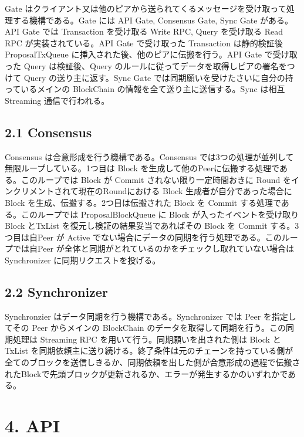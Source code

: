 Gate
はクライアント又は他のピアから送られてくるメッセージを受け取って処理する機構である。Gate
には API Gate, Consensus Gate, Sync Gate がある。API Gate では
Transaction を受け取る Write RPC, Query を受け取る Read RPC
が実装されている。API Gate で受け取った Transaction は静的検証後
ProposalTxQueue に挿入された後、他のピアに伝搬を行う。API Gate
で受け取った Query は検証後、Query
のルールに従ってデータを取得しピアの署名をつけて Query
の送り主に返す。Sync Gate
では同期願いを受けたさいに自分の持っているメインの BlockChain
の情報を全て送り主に送信する。Sync は相互 Streaming 通信で行われる。

\hypertarget{consensus}{%
\subsection{2.1 Consensus}\label{consensus}}

Consensus は合意形成を行う機構である。Consensus
では3つの処理が並列して無限ループしている。1つ目は Block
を生成して他のPeerに伝搬する処理である。このループでは Block が Commit
されない限り一定時間おきに Round
をインクリメントされて現在のRoundにおける Block
生成者が自分であった場合に Block を生成、伝搬する。2つ目は伝搬された
Block を Commit する処理である。このループでは ProposalBlockQueue に
Block が入ったイベントを受け取り Block とTxList
を復元し検証の結果妥当であればその Block を Commit する。3つ目は自Peer
が Active でない場合にデータの同期を行う処理である。このループでは自Peer
が全体と同期がとれているのかをチェックし取れていない場合は Synchronizer
に同期リクエストを投げる。

\hypertarget{synchronizer}{%
\subsection{2.2 Synchronizer}\label{synchronizer}}

Synchronzier はデータ同期を行う機構である。Synchronizer では Peer
を指定してその Peer からメインの BlockChain
のデータを取得して同期を行う。この同期処理は Streaming RPC
を用いて行う。同期願いを出された側は Block と TxList
を同期依頼主に送り続ける。終了条件は元のチェーンを持っている側が全てのブロックを送信しきるか、同期依頼を出した側が合意形成の過程で伝搬されたBlockで先頭ブロックが更新されるか、エラーが発生するかのいずれかである。

\hypertarget{api}{%
\section{4. API}\label{api}}

